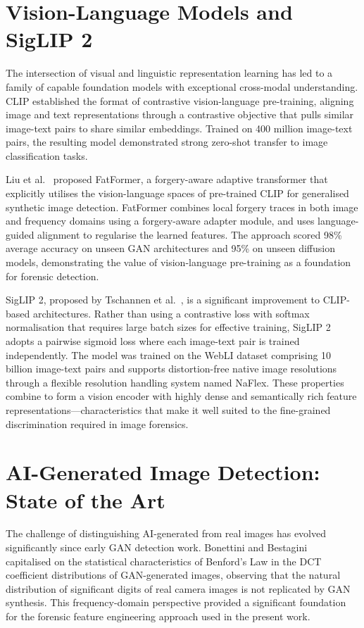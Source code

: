 \section{Vision-Language Models and SigLIP 2}

The intersection of visual and linguistic representation learning has led to a family of capable foundation models with exceptional cross-modal understanding. CLIP \cite{radford2021learning} established the format of contrastive vision-language pre-training, aligning image and text representations through a contrastive objective that pulls similar image-text pairs to share similar embeddings. Trained on 400 million image-text pairs, the resulting model demonstrated strong zero-shot transfer to image classification tasks.

Liu et al.~\cite{liu2024fatformer} proposed FatFormer, a forgery-aware adaptive transformer that explicitly utilises the vision-language spaces of pre-trained CLIP for generalised synthetic image detection. FatFormer combines local forgery traces in both image and frequency domains using a forgery-aware adapter module, and uses language-guided alignment to regularise the learned features. The approach scored 98\% average accuracy on unseen GAN architectures and 95\% on unseen diffusion models, demonstrating the value of vision-language pre-training as a foundation for forensic detection.

SigLIP 2, proposed by Tschannen et al.~\cite{tschannen2025siglip2}, is a significant improvement to CLIP-based architectures. Rather than using a contrastive loss with softmax normalisation that requires large batch sizes for effective training, SigLIP 2 adopts a pairwise sigmoid loss where each image-text pair is trained independently. The model was trained on the WebLI dataset comprising 10 billion image-text pairs and supports distortion-free native image resolutions through a flexible resolution handling system named NaFlex. These properties combine to form a vision encoder with highly dense and semantically rich feature representations---characteristics that make it well suited to the fine-grained discrimination required in image forensics.

\section{AI-Generated Image Detection: State of the Art}

The challenge of distinguishing AI-generated from real images has evolved significantly since early GAN detection work. Bonettini and Bestagini~\cite{bonettini2020benford} capitalised on the statistical characteristics of Benford's Law in the DCT coefficient distributions of GAN-generated images, observing that the natural distribution of significant digits of real camera images is not replicated by GAN synthesis. This frequency-domain perspective provided a significant foundation for the forensic feature engineering approach used in the present work.

